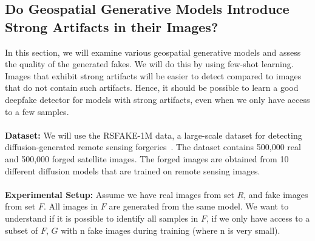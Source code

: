\subsection{Do Geospatial Generative Models Introduce Strong Artifacts in their Images?}
\label{sec:few-shot}
In this section, we will examine various geospatial generative models and assess the quality of the generated fakes. We will do this by using few-shot learning. Images that exhibit strong artifacts will be easier to detect compared to images that do not contain such artifacts. Hence, it should be possible to learn a good deepfake detector for models with strong artifacts, even when we only have access to a few samples.
\\
\\
\noindent \textbf{Dataset:}
We will use the RSFAKE-1M data, a large-scale dataset for detecting diffusion-generated remote sensing forgeries~\cite{tan2025rsfake}. The dataset contains 500,000 real and 500,000 forged satellite images. The forged images are obtained from 10 different diffusion models that are trained on remote sensing images. 
\\
\\
\noindent\textbf{Experimental Setup:} 
Assume we have real images from set $R$, and fake images from set $F$. All images in $F$ are generated from the same model. We want to understand if it is possible to identify all samples in $F$, if we only have access to a subset of $F$, $G$ with n fake images during training (where n is very small).

